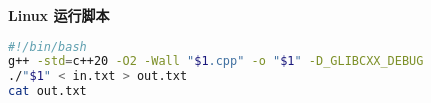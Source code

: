\textbf{Linux 运行脚本}
\begin{lstlisting}[language=bash]
#!/bin/bash
g++ -std=c++20 -O2 -Wall "$1.cpp" -o "$1" -D_GLIBCXX_DEBUG
./"$1" < in.txt > out.txt
cat out.txt
\end{lstlisting}
